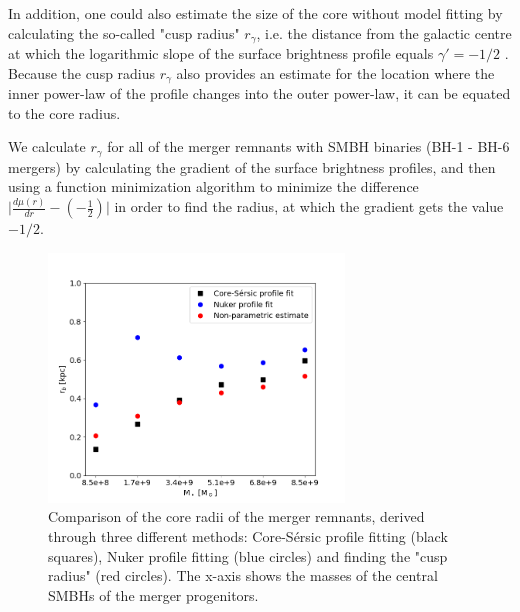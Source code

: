 \documentclass[english, oneside]{HYgradu}
\begin{document}
In addition, one could also estimate the size of the core without model fitting by calculating the so-called "cusp radius" $r_\gamma$, i.e. the distance from the galactic centre at which the logarithmic slope of the surface brightness profile equals $\gamma' = -1/2$ \citep{Carollo1997, Lauer2007Cusp}. Because the cusp radius $r_\gamma$ also provides an estimate for the location where the inner power-law of the profile changes into the outer power-law, it can be equated to the core radius. 

We calculate $r_\gamma$ for all of the merger remnants with SMBH binaries (BH-1 - BH-6 mergers) by calculating the gradient of the surface brightness profiles, and then using a function minimization algorithm \citep{NelderMead} to minimize the difference $\big| \frac{d\mu(r)}{dr} - \left( - \frac{1}{2} \right) \big|$ in order to find the radius, at which the gradient gets the value $-1/2$. 

\begin{figure}[h]
	\centering
	\includegraphics[width=0.7\textwidth]{rb_mass_relation.png}
	\caption{Comparison of the core radii of the merger remnants, derived through three different methods: Core-Sérsic profile fitting (black squares), Nuker profile fitting (blue circles) and  finding the "cusp radius" (red circles). The x-axis shows the masses of the central SMBHs of the merger progenitors.}
	\label{figure:radii_comparison}
\end{figure}
\end{document}
